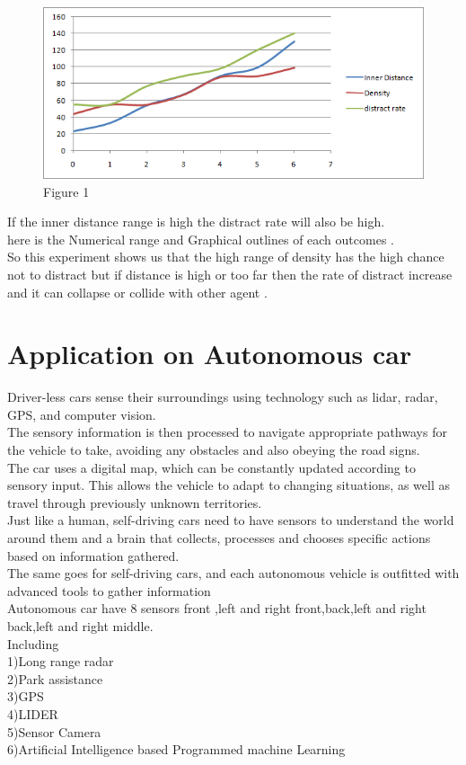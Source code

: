 \documentclass[conference]{IEEEtran}
\begin{document}
\begin{figure}[!h]
\centering
\includegraphics[scale=0.5]{graph.png}
\caption{Figure 1}
\label{fig_sim}
\end{figure}
If the inner distance range is high the distract rate will also be high.\\
here is the Numerical range and Graphical outlines of each outcomes .\\
So this experiment shows us that the high range of density has the high chance not to distract but if distance is high or too far then the rate of distract increase and it can collapse or collide with other agent .

\section{Application on Autonomous car}
Driver-less cars sense their surroundings using technology such as lidar, radar, GPS, and computer vision.\\
The sensory information is then processed to navigate appropriate pathways for the vehicle to take, avoiding any obstacles and also obeying the road signs.\\
The car uses a digital map, which can be constantly updated according to sensory input. This allows the vehicle to adapt to changing situations, as well as travel through previously unknown territories.\\
Just like a human, self-driving cars need to have sensors to understand the world around them and a brain that collects, processes and chooses specific actions based on information gathered.\\

The same goes for self-driving cars, and each autonomous vehicle is outfitted with advanced tools to gather information\\
Autonomous car have 8 sensors front ,left and right front,back,left and right back,left and right middle.\\
Including\\
1)Long range radar\\
2)Park assistance\\
3)GPS\\
4)LIDER\\
5)Sensor Camera\\
6)Artificial Intelligence based Programmed machine Learning\\
\end{document}

